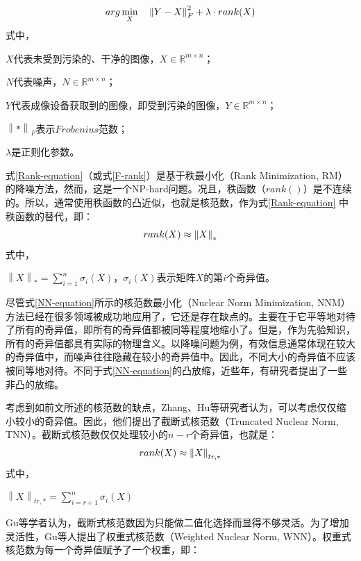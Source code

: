 \documentclass[12pt, a4paper]{article}
\begin{document}
\begin{equation}
\centering
arg\min\limits_{X} \quad \left\|Y-X\right\|_F^2 + \lambda \cdot rank(X)
\label{F-rank}
\end{equation}
式中，
\par$X$代表未受到污染的、干净的图像，$X \in \mathbb{R}^{m \times n}$；
\par$N$代表噪声，$N \in \mathbb{R}^{m \times n}$；
\par$Y$代表成像设备获取到的图像，即受到污染的图像，$Y \in \mathbb{R}^{m \times n}$；
\par$\left\|*\right\|_F$表示$Frobenius$范数；
\par$\lambda$是正则化参数。
\par 式\ref{Rank-equation}（或式\ref{F-rank}）是基于秩最小化（Rank Minimization, RM）的降噪方法，然而，这是一个NP-hard问题\cite{TNN-1}。况且，秩函数（$rank()$）是不连续的\cite{TNN-1}。所以，通常使用秩函数的凸近似，也就是核范数，作为式\ref{Rank-equation} 中秩函数的替代\cite{TNN-1}，即：
\begin{equation}
\centering
rank(X) \approx \left\|X\right\|_*
\label{NN-equation}
\end{equation}
式中，
\par $\left\|X\right\|_* = \sum\limits_{i=1}^{n}\sigma_i(X)$，$\sigma_i(X)$表示矩阵$X$的第$i$个奇异值。
\par 尽管式\ref{NN-equation}所示的核范数最小化（Nuclear Norm Minimization, NNM）方法已经在很多领域被成功地应用了，它还是存在缺点的。主要在于它平等地对待了所有的奇异值，即所有的奇异值都被同等程度地缩小了\cite{Review}。但是，作为先验知识，所有的奇异值都具有实际的物理含义。以降噪问题为例，有效信息通常体现在较大的奇异值中，而噪声往往隐藏在较小的奇异值中。因此，不同大小的奇异值不应该被同等地对待\cite{WNN-1}。不同于式\ref{NN-equation}的凸放缩，近些年，有研究者提出了一些非凸的放缩。
\par 考虑到如前文所述的核范数的缺点，Zhang、Hu等研究者认为，可以考虑仅仅缩小较小的奇异值\cite{TNN-1}。因此，他们提出了截断式核范数（Truncated Nuclear Norm, TNN）。截断式核范数仅仅处理较小的$n-r$个奇异值，也就是：
\begin{equation}
\centering
rank(X) \approx \left\|X\right\|_{tr,*}
\label{TNN-equation}
\end{equation}
式中，
\par $\left\|X\right\|_{tr,*} = \sum\limits_{i=r+1}^{n}\sigma_i(X)$
\par Gu等学者认为，截断式核范数因为只能做二值化选择而显得不够灵活\cite{WNN-1}。为了增加灵活性，Gu等人提出了权重式核范数（Weighted Nuclear Norm, WNN）。权重式核范数为每一个奇异值赋予了一个权重，即：
\end{document}
